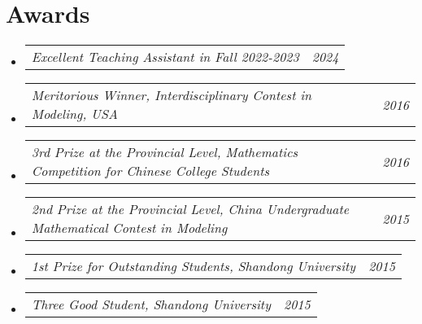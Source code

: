 \documentclass[letterpaper,10pt]{article}
\makeatletter
\newcommand{\resumeSubSubheading}[2]{
    \item
    \begin{tabular*}{0.97\textwidth}{l@{\extracolsep{\fill}}r}
      \textit{\small#1} & \textit{\small #2} \\
    \end{tabular*}\vspace{-7pt}
}
\newcommand{\resumeSubHeadingListStart}{\begin{itemize}[leftmargin=0.15in, label={}]}
\newcommand{\resumeSubHeadingListEnd}{\end{itemize}}
\makeatother
\begin{document}
  \section{Awards}
  \resumeSubHeadingListStart
    \resumeSubSubheading
      {Excellent Teaching Assistant in Fall 2022-2023}{2024}
    \resumeSubSubheading
      {Meritorious Winner, Interdisciplinary Contest in Modeling, USA}{2016}
    \resumeSubSubheading
      {3rd Prize at the Provincial Level, Mathematics Competition for Chinese College Students}{2016}
    \resumeSubSubheading
      {2nd Prize at the Provincial Level, China Undergraduate Mathematical Contest in Modeling}{2015}
    \resumeSubSubheading
      {1st Prize for Outstanding Students, Shandong University}{2015}
    \resumeSubSubheading
      {Three Good Student, Shandong University}{2015}
  \resumeSubHeadingListEnd
\end{document}
